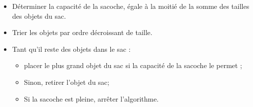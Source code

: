 \begin{itemize}
\item Déterminer la capacité de la sacoche, égale à la moitié de la somme des tailles des objets du sac.
\item Trier les objets par ordre décroissant de taille.
\item Tant qu'il reste des objets dans le sac :
  \begin{itemize}
  \item placer le plus grand objet du sac si la capacité de la sacoche le permet ;
  \item Sinon, retirer l'objet du sac;
  \item Si la sacoche est pleine, arrêter l'algorithme.
  \end{itemize}
\end{itemize}
